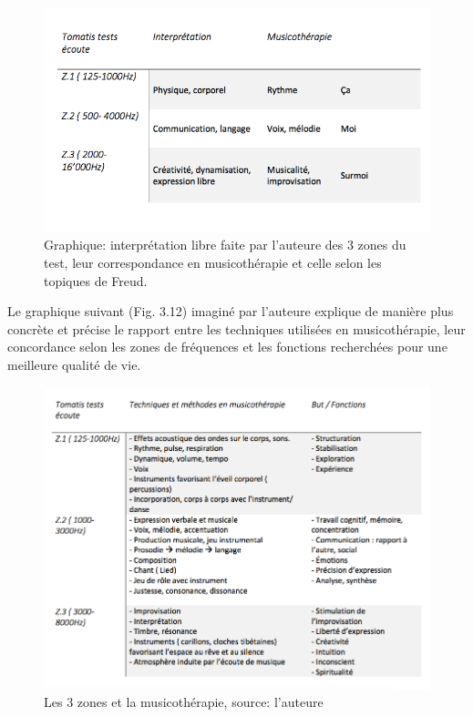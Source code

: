 \begin{figure}
	\centering
	\includegraphics[width=0.7\linewidth]{images/testinterpmusico}
	\caption[ L'interprétation des 3 zones et leur correspondance
	en musicothérapie]{Graphique: interprétation libre faite par l'auteure des 3 zones du
		test, leur correspondance en musicothérapie et celle selon les
		topiques de Freud.}
	
	\label{graphiquecolonnetestmusico}
\end{figure}
 \clearpage
 Le graphique suivant (Fig. 3.12) imaginé par l'auteure explique de manière plus concrète et précise le 
 rapport entre les 
 techniques 
 utilisées en musicothérapie, leur concordance selon les zones de fréquences et les fonctions 
 recherchées pour 
 une meilleure qualité de vie.
\begin{figure}[tbh]
	\centering
	\includegraphics[width=0.7\linewidth]{images/testtechnmethbut}
	\caption[Zones du test avec la musicothérapie]{Les 3
		zones et la musicothérapie, source: l'auteure}
	
	\label{testbutetfonction}
\end{figure}


